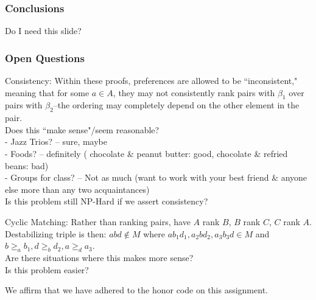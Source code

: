 \documentclass[mathserif,serif]{beamer}
\newcommand{\honor}{We affirm that we have adhered to the honor code on this assignment.}
\begin{document}
\begin{frame}

	\frametitle{Conclusions}
	
	Do I need this slide?
	
\end{frame}

\begin{frame}

	\frametitle{Open Questions}
		
	Consistency: Within these proofs, preferences are allowed to be ``inconsistent," meaning that for some $a \in A$, they may not consistently rank pairs with $\beta_1$ over pairs with $\beta_2$--the ordering may completely depend on the other element in the pair. \\
	
		Does this ``make sense"/seem reasonable?\\ 
			- Jazz Trios? -- sure, maybe\\
			- Foods? -- definitely ( chocolate \& peanut butter: good, chocolate \& refried beans: bad)\\
			- Groups for class? -- Not as much (want to work with your best friend \& anyone else more than any two acquaintances)\\
			
	Is this problem still NP-Hard if we assert consistency?
	
	Cyclic Matching: Rather than ranking pairs, have $A$ rank $B$, $B$ rank $C$, $C$ rank $A$.  
	Destabilizing triple is then: $abd \notin M$ where $a b_1 d_1, a_2 b d_2, a_3 b_3 d \in M$ and $b \geq_a b_1, d \geq_b d_2, a \geq_d a_3$.\\
	
	Are there situations where this makes more sense?\\ %
	Is this problem easier?
	 
\end{frame}

\begin{frame}
	\honor
\end{frame}

\end{document}
